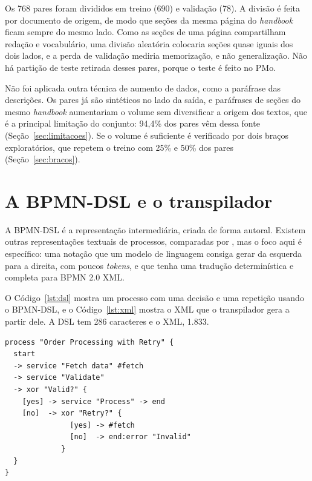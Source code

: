 Os 768 pares foram divididos em treino (690) e validação (78). A divisão é feita por documento de origem, de modo que seções da mesma página do \textit{handbook} ficam sempre do mesmo lado. Como as seções de uma página compartilham redação e vocabulário, uma divisão aleatória colocaria seções quase iguais dos dois lados, e a perda de validação mediria memorização, e não generalização. Não há partição de teste retirada desses pares, porque o teste é feito no PMo.

Não foi aplicada outra técnica de aumento de dados, como a paráfrase das descrições. Os pares já são sintéticos no lado da saída, e paráfrases de seções do mesmo \textit{handbook} aumentariam o volume sem diversificar a origem dos textos, que é a principal limitação do conjunto: 94,4\% dos pares vêm dessa fonte (Seção~\ref{sec:limitacoes}). Se o volume é suficiente é verificado por dois braços exploratórios, que repetem o treino com 25\% e 50\% dos pares (Seção~\ref{sec:bracos}).

\section{A BPMN-DSL e o transpilador}\label{sec:dsl}\label{sec:transpilacao}

A BPMN-DSL é a representação intermediária, criada de forma autoral. Existem outras representações textuais de processos, comparadas por , mas o foco aqui é específico: uma notação que um modelo de linguagem consiga gerar da esquerda para a direita, com poucos \textit{tokens}, e que tenha uma tradução determinística e completa para BPMN 2.0 XML.

O Código~\ref{lst:dsl} mostra um processo com uma decisão e uma repetição usando o BPMN-DSL, e o Código~\ref{lst:xml} mostra o XML que o transpilador gera a partir dele. A DSL tem 286 caracteres e o XML, 1.833.

\begin{lstlisting}[float=p,caption={Processo com decisão e repetição na BPMN-DSL},label={lst:dsl}]
process "Order Processing with Retry" {
  start
  -> service "Fetch data" #fetch
  -> service "Validate"
  -> xor "Valid?" {
    [yes] -> service "Process" -> end
    [no]  -> xor "Retry?" {
               [yes] -> #fetch
               [no]  -> end:error "Invalid"
             }
  }
}
\end{lstlisting}

